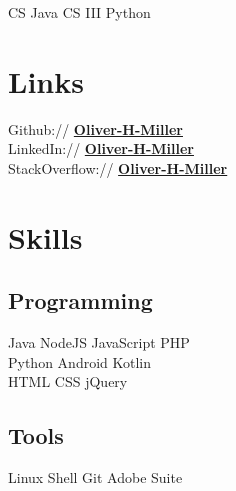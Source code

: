 \documentclass[letterpaper]{deedy-resume} %
\begin{document}
\begin{minipage}[t]{0.33\textwidth}
 CS Java \textbullet{} CS III Python

\sectionspace %


\section{Links} 

Github:// \href{https://github.com/Oliver-H-Miller}{\bf Oliver-H-Miller} \\
LinkedIn:// \href{https://www.linkedin.com/in/Oliver-H-Miller}{\bf Oliver-H-Miller} \\
StackOverflow:// \href{https://stackoverflow.com/users/3152313}{\bf Oliver-H-Miller} \\

\sectionspace %


\section{Skills}

\subsection{Programming}
Java \textbullet{} NodeJS \textbullet{} JavaScript \textbullet{} PHP \\
Python \textbullet{} Android \textbullet{} Kotlin \\
HTML \textbullet{} CSS \textbullet{} jQuery \\

\sectionspace %

\subsection{Tools}
Linux \textbullet{} Shell \textbullet{} Git \textbullet{} Adobe Suite \\

\sectionspace %



\end{minipage}
\end{document}
